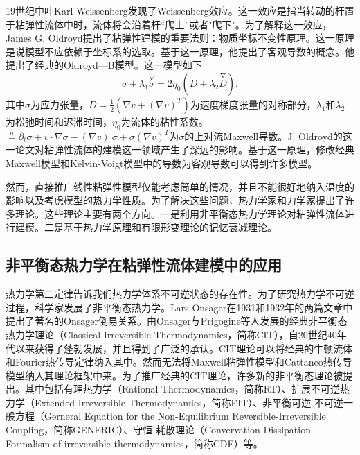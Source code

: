 \documentclass{article}
\begin{document}
19世纪中叶Karl Weissenberg发现了Weissenberg效应。这一效应是指当转动的杆置于粘弹性流体中时，流体将会沿着杆“爬上”或者"爬下"\cite{}。为了解释这一效应，James G. Oldroyd提出了粘弹性建模的重要法则：物质坐标不变性原理。这一原理是说模型不应依赖于坐标系的选取。基于这一原理，他提出了客观导数的概念。他提出了经典的Oldroyd—B模型。这一模型如下
\begin{equation} \label{eq：Oldroyd}
	{\sigma} + \lambda_1 \stackrel{\nabla}{{\sigma}} = 2\eta_0 ({D} + \lambda_2 \stackrel{\nabla}{{D}}).
\end{equation}
其中$\sigma$为应力张量，$D=\frac{1}{2} (\nabla v + (\nabla v)^T)$为速度梯度张量的对称部分，$\lambda_1$和$\lambda_2$为松弛时间和迟滞时间，$\eta_0$为流体的粘性系数。$\stackrel{\sigma} = \partial_t \sigma + v \cdot \nabla \sigma - (\nabla v)\  \sigma + \sigma (\nabla v)^T$为$\sigma$的上对流Maxwell导数\cite{}。J. Oldroyd的这一论文对粘弹性流体的建模这一领域产生了深远的影响。基于这一原理，修改经典Maxwell模型和Kelvin-Voigt模型中的导数为客观导数可以得到许多模型\cite{}。

然而，直接推广线性粘弹性模型仅能考虑简单的情况，并且不能很好地纳入温度的影响以及考虑模型的热力学性质。为了解决这些问题，热力学家和力学家提出了许多理论。这些理论主要有两个方向。一是利用非平衡态热力学理论对粘弹性流体进行建模\cite{}。二是基于热力学原理和有限形变理论的记忆衰减理论\cite{}。

\subsection{非平衡态热力学在粘弹性流体建模中的应用}
热力学第二定律告诉我们热力学体系不可逆状态的存在性。为了研究热力学不可逆过程，科学家发展了非平衡态热力学。Lars Onsager在1931和1932年的两篇文章中提出了著名的Onsager倒易关系\cite{}。由Onsager与Prigogine等人发展的经典非平衡态热力学理论（Classical Irreversible Thermodynamics，简称CIT），自20世纪40年代以来获得了蓬勃发展，并且得到了广泛的承认\cite{}。CIT理论可以将经典的牛顿流体和Fourier热传导定律纳入其中。然而无法将Maxwell粘弹性模型和Cattaneo热传导模型纳入其理论框架中来。为了推广经典的CIT理论，许多新的非平衡态理论被提出。其中包括有理热力学（Rational Thermodynamics，简称RT）、扩展不可逆热力学（Extended Irreversible Thermodynamics，简称EIT）、非平衡可逆-不可逆一般方程（Gerneral Equation for the Non-Equilibrium Reversible-Irreversible Coupling，简称GENERIC）、守恒-耗散理论（Convervation-Dissipation Formalism of irreversible thermodynamics，简称CDF）等\cite{}。
\end{document}
